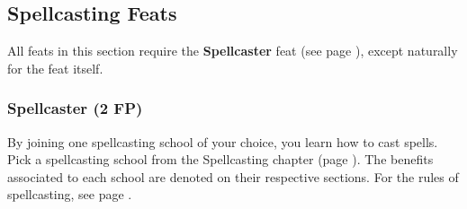 \subsection*{Spellcasting Feats}
All feats in this section require the \textbf{Spellcaster} feat (see page \pageref{feat::spellcaster}), except naturally for the feat itself.



\subsubsection{Spellcaster (2 FP)} \label{feat::spellcaster}
    By joining one spellcasting school of your choice, you learn how to cast spells.
    Pick a spellcasting school from the Spellcasting chapter (page \pageref{ch::spellcasting}).
    The benefits associated to each school are denoted on their respective sections.
    For the rules of spellcasting, see page \pageref{sec::spellcastingrules}.
